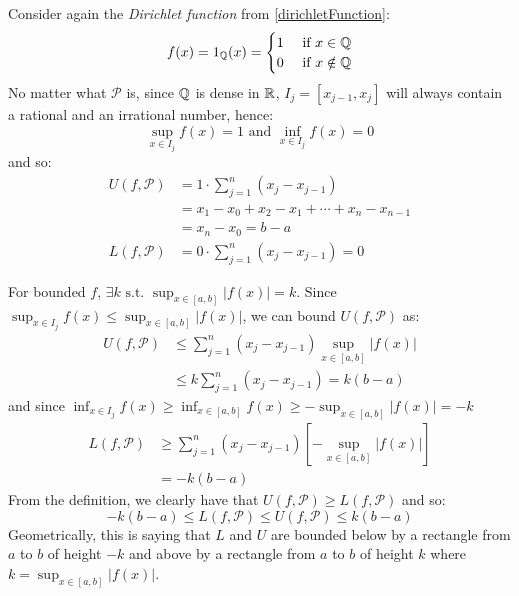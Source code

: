 \documentclass[../main.tex]{subfiles}
\begin{document}
\begin{example}
  Consider again the \textit{Dirichlet function} from \cref{dirichletFunction}:
  \label{dirichletUpperLower}
  \[
    f(x) = 1_{\mathbb{Q}}(x) = \begin{cases}
    1 & \text{ if } x \in \mathbb{Q} \\
    0 & \text{ if } x \notin \mathbb{Q}
    \end{cases}
  \]
  No matter what $\mathcal{P}$ is, since $\mathbb{Q}$ is dense in $\mathbb{R}$, $I_j = [x_{j - 1}, x_j]$ will always contain a rational and an irrational number, hence:
  \[
    \sup_{x \in I_j} f(x) = 1 \text{ and } \inf_{x \in I_j} f(x) = 0
  \]
  and so:
  \begin{align*}
    U(f, \mathcal{P}) &= 1 \cdot \sum_{j = 1}^{n} (x_j - x_{j - 1}) \\
                       &= x_1 - x_0 + x_2 - x_1 + \cdots + x_n - x_{n - 1} \\
                       &= x_n - x_0 = b - a \\
    L(f, \mathcal{P}) &= 0 \cdot \sum_{j = 1}^{n} (x_j - x_{j - 1}) = 0
  \end{align*}
\end{example}
For bounded $f$, $\exists k \text{ s.t. } \sup_{x \in [a, b]} |f(x)| = k$.
Since $\sup_{x \in I_j} f(x) \leq \sup_{x \in [a, b]} |f(x)|$, we can bound $U(f, \mathcal{P})$ as:
\begin{align*}
  U(f, \mathcal{P}) &\leq \sum_{j = 1}^{n} (x_{j} - x_{j - 1}) \sup_{x \in [a, b]} |f(x)|  \\
                     &\leq k \sum_{j = 1}^{n} (x_j - x_{j - 1}) = k(b - a)
\end{align*}
and since $\inf_{x \in I_j} f(x) \geq \inf_{x \in [a, b]} f(x) \geq -\sup_{x \in [a, b]} |f(x)| = -k$
\begin{align*}
  L(f, \mathcal{P}) &\geq \sum_{j = 1}^{n} (x_{j} - x_{j -1}) \left[- \sup_{x \in [a, b]} |f(x)|\right] \\
                     &= -k(b - a)
\end{align*}
From the definition, we clearly have that $U(f, \mathcal{P}) \geq L(f, \mathcal{P})$ and so:
\[
  -k(b - a) \leq L(f, \mathcal{P}) \leq U(f, \mathcal{P}) \leq k(b - a)
\]
Geometrically, this is saying that $L$ and $U$ are bounded below by a rectangle from $a$ to $b$ of height $-k$ and above by a rectangle from $a$ to $b$ of height $k$ where $k = \sup_{x \in [a, b]} |f(x)|$.
\end{document}
